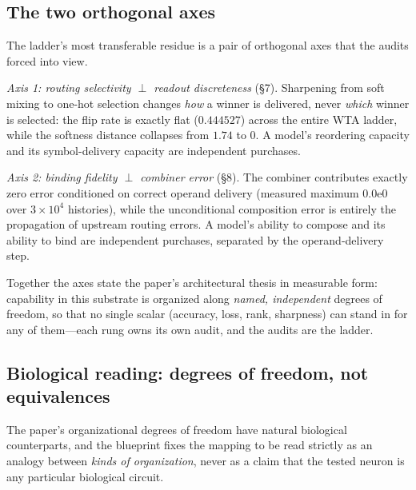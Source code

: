 \subsection{The two orthogonal axes}
\label{sec:axes}

The ladder's most transferable residue is a pair of orthogonal axes that
the audits forced into view.

\emph{Axis 1: routing selectivity $\perp$ readout discreteness} (§7).
Sharpening from soft mixing to one-hot selection changes \emph{how} a
winner is delivered, never \emph{which} winner is selected: the flip rate
is exactly flat ($0.444527$) across the entire WTA ladder, while the
softness distance collapses from $1.74$ to $0$. A model's reordering
capacity and its symbol-delivery capacity are independent purchases.

\emph{Axis 2: binding fidelity $\perp$ combiner error} (§8). The combiner
contributes exactly zero error conditioned on correct operand delivery
(measured maximum $0.0\mathrm{e}0$ over $3\times10^4$ histories), while
the unconditional composition error is entirely the propagation of
upstream routing errors. A model's ability to compose and its ability to
bind are independent purchases, separated by the operand-delivery step.

Together the axes state the paper's architectural thesis in measurable
form: capability in this substrate is organized along \emph{named,
independent} degrees of freedom, so that no single scalar (accuracy, loss,
rank, sharpness) can stand in for any of them---each rung owns its own
audit, and the audits are the ladder.

\enlargethispage{2\baselineskip}
\subsection{Biological reading: degrees of freedom, not equivalences}
\label{sec:bio}

The paper's organizational degrees of freedom have natural biological
counterparts, and the blueprint fixes the mapping to be read strictly as
an analogy between \emph{kinds of organization}, never as a claim that the
tested neuron is any particular biological circuit.

